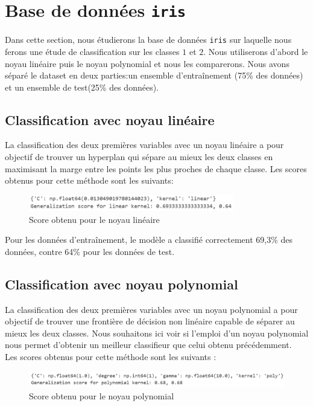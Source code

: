 \documentclass[a4paper,12pt]{article}
\begin{document}
\section{Base de données \texttt{iris}}

Dans cette section, nous étudierons la base de données \texttt{iris} sur laquelle nous ferons une étude de classification sur les classes $1$ et $2$.
Nous utiliserons d'abord le noyau linéaire puis le noyau polynomial et nous les comparerons.
Nous avons séparé le dataset en deux parties:un ensemble d'entraînement (75\% des données) et un ensemble de test(25\% des données). 

\subsection{Classification avec noyau linéaire}

La classification des deux premières variables avec un noyau linéaire a pour objectif de trouver un hyperplan qui sépare au mieux les deux classes en maximisant la marge entre les points les plus proches de chaque classe. 
Les scores obtenus pour cette méthode sont les suivants:

\begin{figure}[H]
    \centering
    \includegraphics[width=0.8\textwidth]{Images/linear_score.png}
    \caption{Score obtenu pour le noyau linéaire}\label{fig:linear}
\end{figure}

Pour les données d'entraînement, le modèle a classifié correctement 69,3\% des données, contre 64\% pour les données de test. 


\subsection{Classification avec noyau polynomial}

La classification des deux premières variables avec un noyau polynomial a pour objectif de trouver une frontière de décision non linéaire capable de séparer au mieux les deux classes. 
Nous souhaitons ici voir si l'emploi d'un noyau polynomial nous permet d'obtenir un meilleur classifieur que celui obtenu précédemment.\\
Les scores obtenus pour cette méthode sont les suivants :

\begin{figure}[H]
    \centering
    \includegraphics[width=\textwidth]{Images/poly_score.png}
    \caption{Score obtenu pour le noyau polynomial}\label{fig:poly}
\end{figure}
\end{document}
